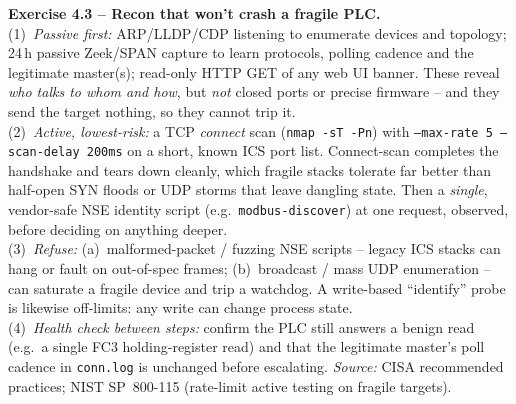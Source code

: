 \documentclass[11pt,a4paper]{article}
\begin{document}
\begin{solutionbox}
\textbf{Exercise 4.3 -- Recon that won't crash a fragile PLC.}\\[2pt]
(1)~\emph{Passive first:} ARP/LLDP/CDP listening to enumerate devices and topology; 24\,h passive
Zeek/SPAN capture to learn protocols, polling cadence and the legitimate master(s); read-only HTTP
GET of any web UI banner. These reveal \emph{who talks to whom and how}, but \emph{not} closed ports
or precise firmware -- and they send the target nothing, so they cannot trip it.\\
(2)~\emph{Active, lowest-risk:} a TCP \emph{connect} scan (\texttt{nmap -sT -Pn}) with
\texttt{--max-rate 5 --scan-delay 200ms} on a short, known ICS port list. Connect-scan completes the
handshake and tears down cleanly, which fragile stacks tolerate far better than half-open SYN
floods or UDP storms that leave dangling state. Then a \emph{single}, vendor-safe NSE identity
script (e.g.\ \texttt{modbus-discover}) at one request, observed, before deciding on anything deeper.\\
(3)~\emph{Refuse:} (a)~malformed-packet / fuzzing NSE scripts -- legacy ICS stacks can hang or fault
on out-of-spec frames; (b)~broadcast / mass UDP enumeration -- can saturate a fragile device and
trip a watchdog. A write-based ``identify'' probe is likewise off-limits: any write can change
process state.\\
(4)~\emph{Health check between steps:} confirm the PLC still answers a benign read (e.g.\ a single
FC3 holding-register read) and that the legitimate master's poll cadence in \texttt{conn.log} is
unchanged before escalating. \emph{Source:} CISA recommended practices; NIST SP~800-115 (rate-limit
active testing on fragile targets).
\end{solutionbox}
\end{document}
